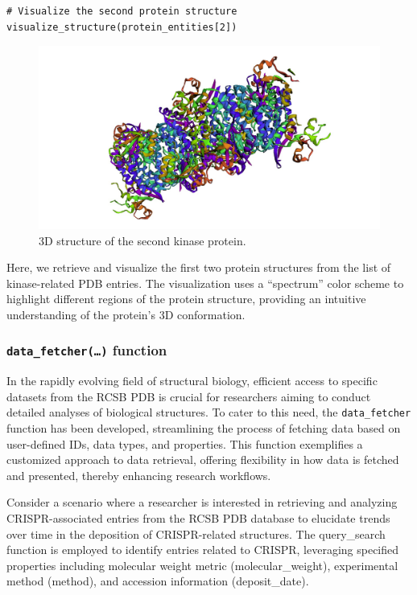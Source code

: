 \begin{verbatim}
# Visualize the second protein structure
visualize_structure(protein_entities[2])
\end{verbatim}

\begin{figure}[H]

{\centering \includegraphics[width=1\linewidth,]{figures/figure5} 

}

\caption{3D structure of the second kinase protein.}\label{fig:figure5}
\end{figure}

Here, we retrieve and visualize the first two protein structures from the list of kinase-related PDB entries. The visualization uses a ``spectrum'' color scheme to highlight different regions of the protein structure, providing an intuitive understanding of the protein's 3D conformation.

\subsubsection{\texorpdfstring{\texttt{data\_fetcher(…)} function}{data\_fetcher(\ldots) function}}\label{data_fetcher-function}

In the rapidly evolving field of structural biology, efficient access to specific datasets from the RCSB PDB is crucial for researchers aiming to conduct detailed analyses of biological structures. To cater to this need, the \texttt{data\_fetcher} function has been developed, streamlining the process of fetching data based on user-defined IDs, data types, and properties. This function exemplifies a customized approach to data retrieval, offering flexibility in how data is fetched and presented, thereby enhancing research workflows.

Consider a scenario where a researcher is interested in retrieving and analyzing CRISPR-associated entries from the RCSB PDB database to elucidate trends over time in the deposition of CRISPR-related structures. The query\_search function is employed to identify entries related to CRISPR, leveraging specified properties including molecular weight metric (molecular\_weight), experimental method (method), and accession information (deposit\_date).

